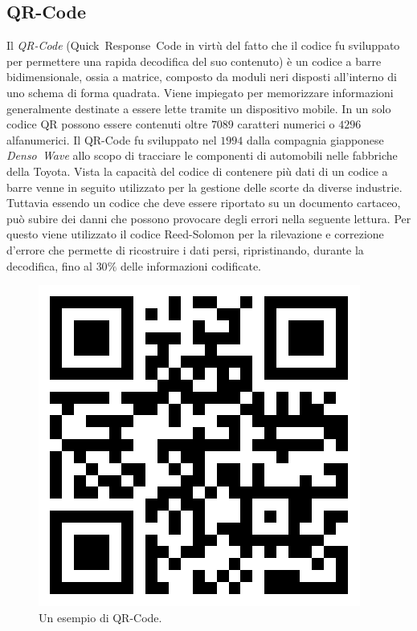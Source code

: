 \subsection{QR-Code}
	\label{subsec:qrcode}
Il \emph{QR-Code} (Quick~Response~Code in virtù del fatto che il codice fu sviluppato per permettere una rapida decodifica del suo contenuto) è un codice a barre bidimensionale, ossia a matrice, composto da moduli neri disposti all'interno di uno schema di forma quadrata. Viene impiegato per memorizzare informazioni generalmente destinate a essere lette tramite un dispositivo mobile. In un solo codice QR possono essere contenuti oltre $7089$ caratteri numerici o $4296$ alfanumerici.
Il QR-Code fu sviluppato nel $1994$ dalla compagnia giapponese \emph{Denso~Wave} allo scopo di tracciare le componenti di automobili nelle fabbriche della Toyota. Vista la capacità del codice di contenere più dati di un codice a barre venne in seguito utilizzato per la gestione delle scorte da diverse industrie.
Tuttavia essendo un codice che deve essere riportato su un documento cartaceo, può subire dei danni che possono provocare degli errori nella seguente lettura.
Per questo viene utilizzato il codice Reed-Solomon per la rilevazione e correzione d'errore che permette di ricostruire i dati persi, ripristinando, durante la decodifica, fino al $30\%$ delle informazioni codificate.

	\begin{center}	
		\begin{figure}[H]
		\centering
		\includegraphics[scale=0.3]{Immagini/qrcode}
		\caption[Esempio di QR-Code]{Un esempio di QR-Code.}
		\label{fig:qrcode}
		\end{figure}
	\end{center}

